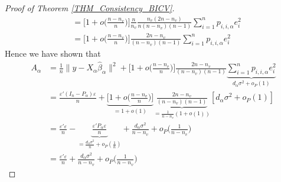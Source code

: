 \documentclass[Research_Module_ES.tex]{subfiles}
\begin{document}
\begin{proof}[Proof of Theorem \ref{THM_Consistency_BICV}]
\begin{align*}
	&=  \biggl[1+o\biggl(\frac{n-n_v}{n}\biggr)\biggr]\frac{n}{n_v}\frac{n_v(2n-n_v)}{n(n-n_v)(n-1)} \sum_{i=1}^np_{i,i,\alpha}e_i^2\\
	&=\biggl[1+o\biggl(\frac{n-n_v}{n}\biggr)\biggr]\frac{2n-n_v}{(n-n_v)(n-1)} \sum_{i=1}^np_{i,i,\alpha}e_i^2
	\end{align*}
	Hence we have shown that
	\begin{align*}
	A_\alpha&= \frac{1}{n}\lVert y-X_\alpha\hat{\beta}_\alpha\rVert^2 + \biggl[1+o\biggl(\frac{n-n_v}{n}\biggr)\biggr]\frac{2n-n_v}{(n-n_v)(n-1)} \underbrace{\sum_{i=1}^np_{i,i,\alpha}e_i^2}_{d_\alpha\sigma^2+o_P(1)}\\
	&= \frac{\varepsilon'(I_n-P_\alpha)\varepsilon}{n} +\underbrace{\biggl[1+o\biggl(\frac{n-n_v}{n}\biggr)\biggr]}_{=1+o(1)}\underbrace{\frac{2n-n_v}{(n-n_v)(n-1)}}_{=\frac{1}{n-n_v}(1+o(1))} [d_\alpha\sigma^2+o_P(1)]\\
	&=\frac{\varepsilon'\varepsilon }{n}- \underbrace{\frac{\varepsilon'P_\alpha\varepsilon}{n}}_{=\frac{d_\alpha\sigma^2}{n}+o_P(\frac{1}{n})} + \frac{d_\alpha\sigma^2}{n-n_v}+o_P\biggl(\frac{1}{n-n_v}\biggr)\\
	&=\frac{\varepsilon'\varepsilon }{n}+\frac{d_\alpha\sigma^2}{n-n_v}+o_P\biggl(\frac{1}{n-n_v}\biggr)
	\end{align*}
	

\end{proof}
\end{document}
